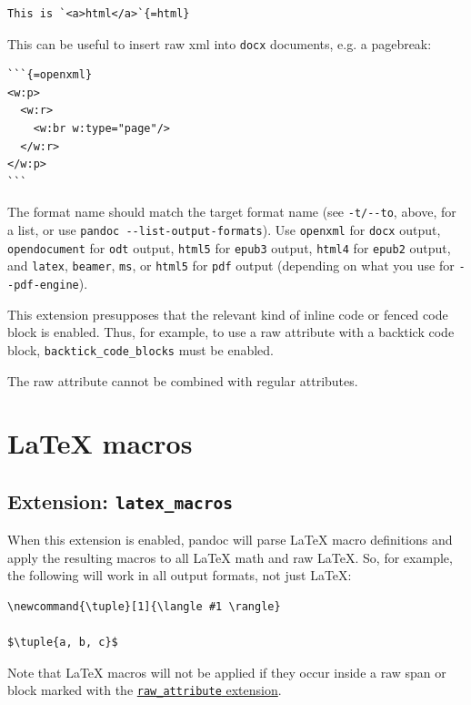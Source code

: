 \documentclass[
  b5paper
]{book}
\begin{document}
\begin{verbatim}
This is `<a>html</a>`{=html}
\end{verbatim}

This can be useful to insert raw xml into \texttt{docx} documents, e.g.
a pagebreak:

\begin{verbatim}
```{=openxml}
<w:p>
  <w:r>
    <w:br w:type="page"/>
  </w:r>
</w:p>
```
\end{verbatim}

The format name should match the target format name (see
\texttt{-t/-\/-to}, above, for a list, or use
\texttt{pandoc\ -\/-list-output-formats}). Use \texttt{openxml} for
\texttt{docx} output, \texttt{opendocument} for \texttt{odt} output,
\texttt{html5} for \texttt{epub3} output, \texttt{html4} for
\texttt{epub2} output, and \texttt{latex}, \texttt{beamer}, \texttt{ms},
or \texttt{html5} for \texttt{pdf} output (depending on what you use for
\texttt{-\/-pdf-engine}).

This extension presupposes that the relevant kind of inline code or
fenced code block is enabled. Thus, for example, to use a raw attribute
with a backtick code block, \texttt{backtick\_code\_blocks} must be
enabled.

The raw attribute cannot be combined with regular attributes.

\section{LaTeX macros}\label{latex-macros}

\subsection{\texorpdfstring{Extension:
\texttt{latex\_macros}}{Extension: latex\_macros}}\label{extension-latex_macros}

When this extension is enabled, pandoc will parse LaTeX macro
definitions and apply the resulting macros to all LaTeX math and raw
LaTeX. So, for example, the following will work in all output formats,
not just LaTeX:

\begin{verbatim}
\newcommand{\tuple}[1]{\langle #1 \rangle}

$\tuple{a, b, c}$
\end{verbatim}

Note that LaTeX macros will not be applied if they occur inside a raw
span or block marked with the
\hyperref[extension-raw_attribute]{\texttt{raw\_attribute} extension}.
\end{document}

